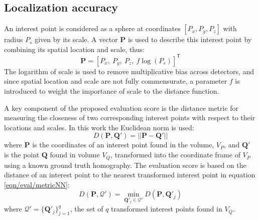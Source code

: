 \subsection{Localization accuracy}

An interest point is considered as a sphere at coordinates $[P_x, P_y, P_z]$ with radius $P_s$ given by its scale. A vector $\mathbf{P}$ is used to describe this interest point by combining its spatial location and scale, thus: 
\begin{equation}
\mathbf{P} = [P_x,~P_y,~P_z,~f\log(P_s)]^\mathsf{T}
\label{eqn/eval/loc_vec}
\end{equation}
The logarithm of scale is used to remove multiplicative bias across detectors, and since spatial location and scale are not fully commensurate, a parameter $f$ is introduced to weight the importance of scale to the distance function.

A key component of the proposed evaluation score is the distance metric for measuring the closeness of two corresponding interest points with respect to their locations and scales. In this work the Euclidean norm is used:
\begin{equation}
D(\mathbf{P}, \mathbf{Q}') = ||\mathbf{P} - \mathbf{Q}'||
\label{eqn/eval/matchdistance}
\end{equation}
where $\mathbf{P}$ is the coordinates of an interest point found in the volume, $V_P$, and $\mathbf{Q}'$ is the point $\mathbf{Q}$ found in volume $V_Q$, transformed into the coordinate frame of $V_P$ using a known ground truth homography. The evaluation score is based on the distance of an interest point to the nearest transformed interest point in equation \ref{eqn/eval/metricNN}:
\begin{equation}
D(\mathbf{P}, \mathcal{Q}') = \min_{\mathbf{Q}'_j \in \mathcal{Q}'}D(\mathbf{P}, \mathbf{Q}'_j)
\label{eqn/eval/metricNN}
\end{equation}
where $\mathcal{Q}' = \{\mathbf{Q}'_j\}_{j=1}^{q}$, the set of $q$ transformed interest points found in $V_Q$.

